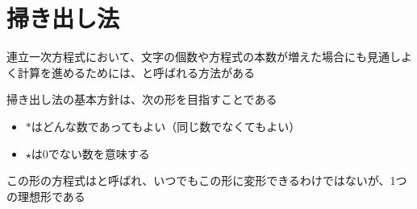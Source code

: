 \documentclass[../../../topic_linear-equation]{subfiles}
\begin{document}
\sectionline
\section{掃き出し法}

連立一次方程式において、文字の個数や方程式の本数が増えた場合にも見通しよく計算を進めるためには、と呼ばれる方法がある

\br

掃き出し法の基本方針は、次の形を目指すことである

\begin{center}
\end{center}

\begin{itemize}
  \item $*$はどんな数であってもよい（同じ数でなくてもよい）
  \item $\star$は0でない数を意味する
\end{itemize}

この形の方程式はと呼ばれ、いつでもこの形に変形できるわけではないが、1つの理想形である
\end{document}
